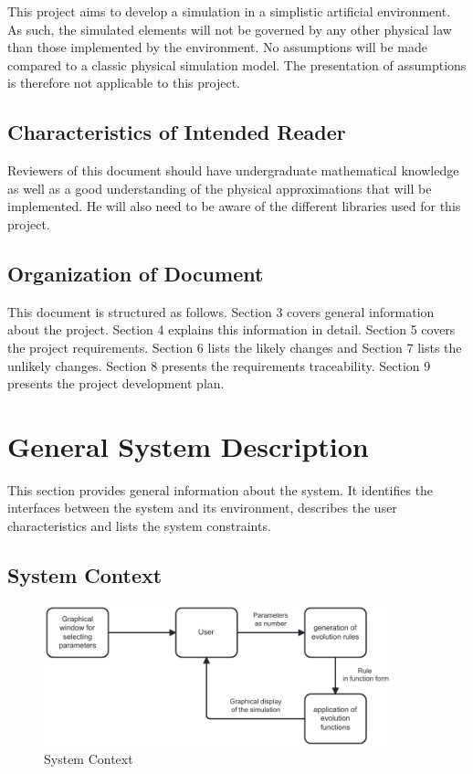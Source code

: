 \documentclass[12pt]{article}
\begin{document}
This project aims to develop a simulation in a simplistic artificial environment. 
As such, the simulated elements will not be governed by any other physical law than those implemented by the environment. 
No assumptions will be made compared to a classic physical simulation model.
The presentation of assumptions is therefore not applicable to this project.

\subsection{Characteristics of Intended Reader} \label{sec_IntendedReader}

Reviewers of this document should have undergraduate mathematical knowledge as well as a 
good understanding of the physical approximations that will be implemented.
He will also need to be aware of the different libraries used for this project.

\subsection{Organization of Document}

This document is structured as follows. Section 3 covers general information about the project. 
Section 4 explains this information in detail. Section 5 covers the project requirements. 
Section 6 lists the likely changes and Section 7 lists the unlikely changes. 
Section 8 presents the requirements traceability. Section 9 presents the project development plan.

\section{General System Description}

This section provides general information about the system.  It identifies the
interfaces between the system and its environment, describes the user
characteristics and lists the system constraints.

\subsection{System Context}

\begin{figure}[h!]
\begin{center}
 \includegraphics[width=0.9\textwidth]{SystemContext.pdf}
\caption{System Context}
\label{Fig_SystemContext} 
\end{center}
\end{figure}
\end{document}
